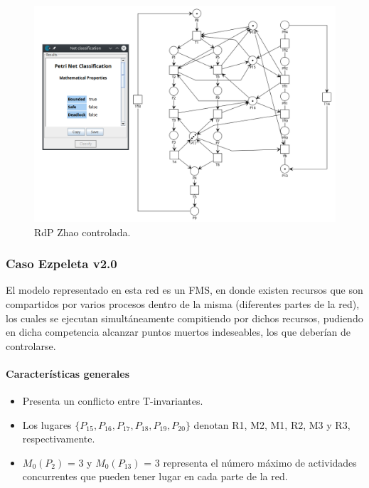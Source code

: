 \begin{figure}[H]
	\centering
	\includegraphics[width=\textwidth]{Figures/algoritmo3/Zhao2.png}
	\caption{RdP Zhao controlada.}
	\label{fig:zhao_controlada}
 \end{figure}

\bigskip
\subsubsection{Caso Ezpeleta v2.0}
El modelo representado en esta red es un FMS, en donde existen recursos que son compartidos por varios procesos dentro de la misma (diferentes partes de la red), los cuales se ejecutan simultáneamente compitiendo por dichos recursos, pudiendo en dicha competencia alcanzar puntos muertos indeseables, los que deberían de controlarse.

\paragraph{Características generales}

\begin{itemize}
    \item Presenta un conflicto entre T-invariantes.
    \item Los lugares $\{P_{15}, P_{16}, P_{17}, P_{18}, P_{19}, P_{20}\}$ denotan R1, M2, M1, R2, M3 y R3, respectivamente.
    \item $M_0(P_2)$ = 3 y $M_0(P_{13})$ = 3 representa el número máximo de actividades concurrentes que pueden tener lugar en cada parte de la red.
\end{itemize}
\bigskip

